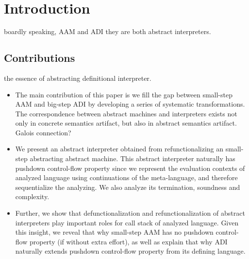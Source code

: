 \documentclass[acmsmall,review,anonymous]{acmart}\settopmatter{printfolios=true,printccs=false,printacmref=false}
\begin{document}




\maketitle

\section{Introduction}

boardly speaking, AAM and ADI they are both abstract interpreters.

\subsection{Contributions}

the essence of abstracting definitional interpreter.

\begin{itemize}
\item The main contribution of this paper is we fill the gap
  between small-step AAM and big-step ADI by developing a series of
  systematic transformations. The correspondence between abstract
  machines and interpreters exists not only in concrete semantics artifact,
  but also in abstract semantics artifact.
  Galois connection?

\item We present an abstract interpreter obtained from refunctionalizing
  an small-step abstracting abstract machine. 
  This abstract interpreter naturally has pushdown control-flow property
  since we represent the evaluation contexts of analyzed language using
  continuations of the meta-language, and therefore sequentialize the
  analyzing.
  We also analyze its termination, soundness and complexity.

\item Further, we show that defunctionalization and refunctionalization
  of abstract interpreters play important roles for call stack of analyzed language.
  Given this insight, we reveal that why small-step AAM has no pushdown
  control-flow property (if without extra effort), as well as explain
  that why ADI naturally extends pushdown control-flow property from its
  defining language.

\end{itemize}
\end{document}

